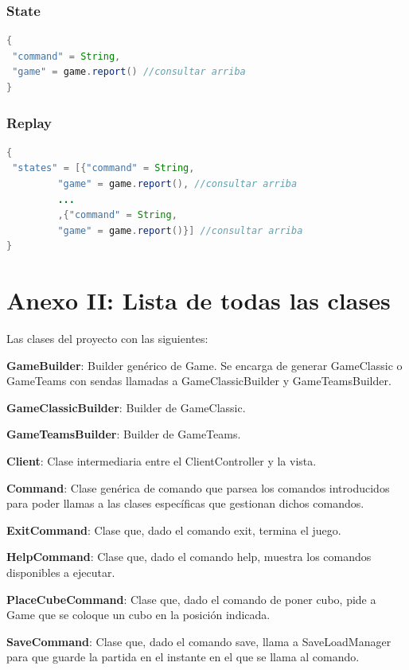 \documentclass[12pt,a4paper,openright]{book}
\theoremstyle{break}
\begin{document}
\newpage

\subsection*{State}
\begin{lstlisting}[frame=single, language=Java]
{
 "command" = String,
 "game" = game.report() //consultar arriba
}
\end{lstlisting}

\subsection*{Replay}
\begin{lstlisting}[frame=single, language=Java]
{
 "states" = [{"command" = String,
 	     "game" = game.report(), //consultar arriba
 	     ...
 	     ,{"command" = String,
 	     "game" = game.report()}] //consultar arriba
}
\end{lstlisting}

\chapter{Anexo II: Lista de todas las clases}

Las clases del proyecto con las siguientes:

\textbf{GameBuilder}: Builder genérico de Game. Se encarga de generar GameClassic o GameTeams con sendas llamadas a GameClassicBuilder y GameTeamsBuilder.

\textbf{GameClassicBuilder}: Builder de GameClassic.

\textbf{GameTeamsBuilder}: Builder de GameTeams.

\textbf{Client}: Clase intermediaria entre el ClientController y la vista.

\textbf{Command}: Clase genérica de comando que parsea los comandos introducidos para poder llamas a las clases específicas que gestionan dichos comandos.

\textbf{ExitCommand}: Clase que, dado el comando exit, termina el juego.

\textbf{HelpCommand}: Clase que, dado el comando help, muestra los comandos disponibles a ejecutar.

\textbf{PlaceCubeCommand}: Clase que, dado el comando de poner cubo, pide a Game que se coloque un cubo en la posición indicada.

\textbf{SaveCommand}: Clase que, dado el comando save, llama a SaveLoadManager para que guarde la partida en el instante en el que se llama al comando.
\end{document}
